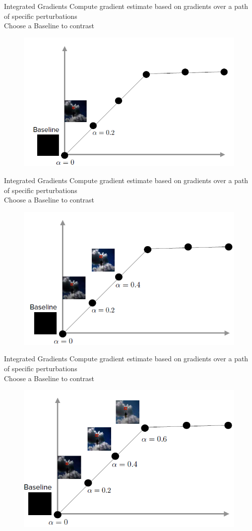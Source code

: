 \documentclass[11pt,compress,t,notes=noshow, aspectratio=169, xcolor=table]{beamer}
\begin{document}
\begin{frame}{Integrated Gradients}
    Compute gradient estimate based on gradients over a path of specific perturbations\\
    Choose a Baseline to contrast %
    \begin{figure}
    \bigskip
    \bigskip
       \includegraphics[width=0.6\linewidth]{bild30}
    \end{figure}
\end{frame}


\begin{frame}{Integrated Gradients}
    Compute gradient estimate based on gradients over a path of specific perturbations\\
    Choose a Baseline to contrast %
    \begin{figure}
    \bigskip
    \bigskip
       \includegraphics[width=0.6\linewidth]{bild31}
    \end{figure}
\end{frame}


\begin{frame}{Integrated Gradients}
    Compute gradient estimate based on gradients over a path of specific perturbations\\
    Choose a Baseline to contrast %
    \begin{figure}
    \bigskip
    \bigskip
       \includegraphics[width=0.6\linewidth]{bild32}
    \end{figure}
\end{frame}
\end{document}
